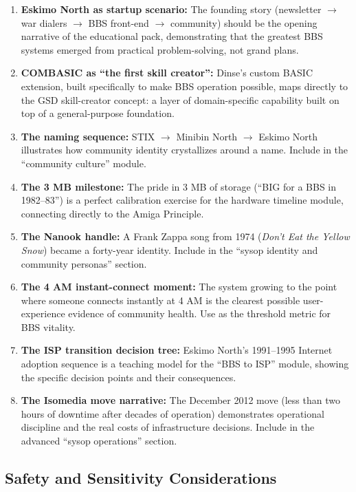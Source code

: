 \documentclass[11pt,letterpaper]{article}
\begin{document}
\begin{enumerate}
  \item \textbf{Eskimo North as startup scenario:} The founding story (newsletter $\rightarrow$ war dialers $\rightarrow$ BBS front-end $\rightarrow$ community) should be the opening narrative of the educational pack, demonstrating that the greatest BBS systems emerged from practical problem-solving, not grand plans.
  \item \textbf{COMBASIC as ``the first skill creator'':} Dinse's custom BASIC extension, built specifically to make BBS operation possible, maps directly to the GSD skill-creator concept: a layer of domain-specific capability built on top of a general-purpose foundation.
  \item \textbf{The naming sequence:} STIX $\rightarrow$ Minibin North $\rightarrow$ Eskimo North illustrates how community identity crystallizes around a name. Include in the ``community culture'' module.
  \item \textbf{The 3 MB milestone:} The pride in 3 MB of storage (``BIG for a BBS in 1982--83'') is a perfect calibration exercise for the hardware timeline module, connecting directly to the Amiga Principle.
  \item \textbf{The Nanook handle:} A Frank Zappa song from 1974 (\textit{Don't Eat the Yellow Snow}) became a forty-year identity. Include in the ``sysop identity and community personas'' section.
  \item \textbf{The 4 AM instant-connect moment:} The system growing to the point where someone connects instantly at 4 AM is the clearest possible user-experience evidence of community health. Use as the threshold metric for BBS vitality.
  \item \textbf{The ISP transition decision tree:} Eskimo North's 1991--1995 Internet adoption sequence is a teaching model for the ``BBS to ISP'' module, showing the specific decision points and their consequences.
  \item \textbf{The Isomedia move narrative:} The December 2012 move (less than two hours of downtime after decades of operation) demonstrates operational discipline and the real costs of infrastructure decisions. Include in the advanced ``sysop operations'' section.
\end{enumerate}

\subsection{Safety and Sensitivity Considerations}
\end{document}
